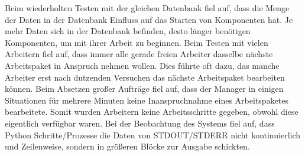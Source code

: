 \begin{description}
        Beim wiederholten Testen mit der gleichen Datenbank fiel auf, dass die Menge der Daten in der Datenbank Einfluss auf das Starten von Komponenten hat. Je mehr Daten sich in der Datenbank befinden, desto länger benötigen Komponenten, um mit ihrer Arbeit zu beginnen.
        Beim Testen mit vielen Arbeitern fiel auf, dass immer alle gerade freien Arbeiter dasselbe nächste Arbeitspaket in Anspruch nehmen wollen. Dies führte oft dazu, das manche Arbeiter erst nach dutzenden Versuchen das nächste Arbeitspaket bearbeiten können.
        Beim Absetzen großer Aufträge fiel auf, dass der Manager in einigen Situationen für mehrere Minuten keine Inanspruchnahme eines Arbeitspaketes bearbeitete. Somit wurden Arbeitern keine Arbeitsschritte gegeben, obwohl diese eigentlich verfügbar waren.
        Bei der Beobachtung des Systems fiel auf, dass Python Schritte/Prozesse
        die Daten von STDOUT/STDERR nicht kontinuierlich und Zeilenweise,
        sondern in größeren Blöcke zur Ausgabe schickten.
\end{description}

